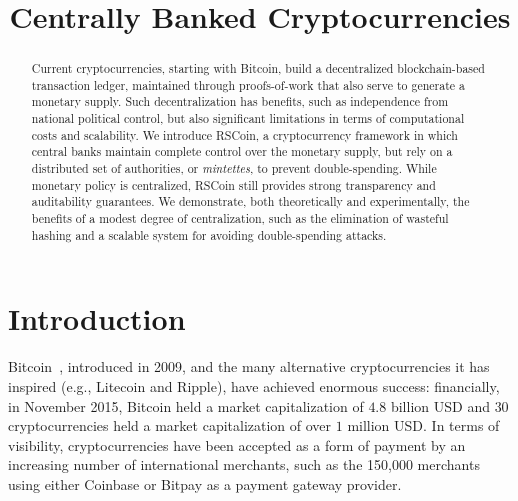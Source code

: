 \documentclass[conference]{IEEEtran}
\title{Centrally Banked Cryptocurrencies}
\author{\IEEEauthorblockN{George Danezis}
\IEEEauthorblockA{University College London\\
\url{g.danezis@ucl.ac.uk}}
\and 
\IEEEauthorblockN{Sarah Meiklejohn}
\IEEEauthorblockA{University College London\\
\url{s.meiklejohn@ucl.ac.uk}}
}
\newcommand{\rscoin}{\textsf{RSCoin}\xspace}
\begin{document}
\IEEEoverridecommandlockouts
\makeatletter{}\makeatother
{}

\maketitle

\begin{abstract}

Current cryptocurrencies, starting with Bitcoin, build a decentralized
blockchain-based transaction ledger, maintained through proofs-of-work that
also serve to generate a monetary supply.  Such decentralization has benefits,
such as
independence from national political control, but also significant limitations
in terms of computational costs and scalability.
We introduce \rscoin, a cryptocurrency framework in which
central banks maintain complete
control over the monetary supply, but rely on a distributed set of
authorities, or \emph{mintettes}, to prevent
double-spending.  While monetary policy is centralized, \rscoin still
provides strong transparency and auditability guarantees.
We demonstrate, both theoretically and experimentally, the benefits of
a modest degree of centralization, such as the elimination of wasteful
hashing and a scalable system for avoiding double-spending attacks.
\end{abstract}

\section{Introduction}



Bitcoin~\cite{satoshi-bitcoin}, introduced in 2009, and
the many alternative cryptocurrencies it has inspired (e.g., Litecoin and
Ripple), have achieved enormous success:
financially, in November 2015, Bitcoin held a market capitalization of $4.8$
billion USD and $30$ cryptocurrencies held a market capitalization of
over $1$ million USD.  In terms of visibility, cryptocurrencies have been
accepted as a
form of payment by an increasing number of international merchants, such as
the 150,000 merchants using either Coinbase or Bitpay as a payment gateway
provider.
\end{document}

